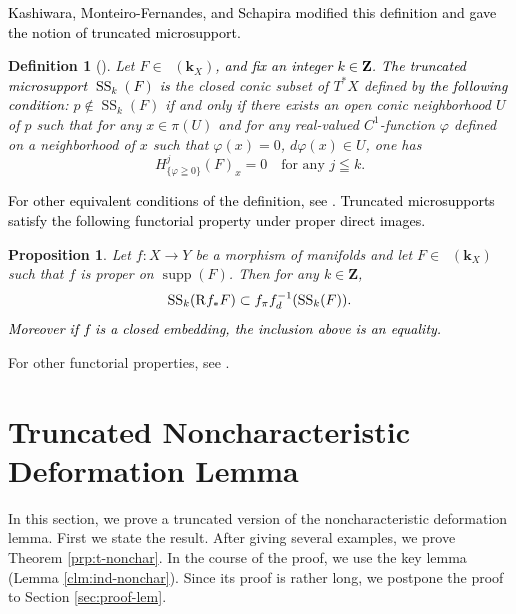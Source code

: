 ﻿\documentclass[a4paper,leqno,dvipdfmx]{jsarticle}
\newtheorem{Definition+}[Axiom+]{Definition}
\newtheorem{Proposition+}[Axiom+]{Proposition}
\theoremstyle{definition}
\newcommand{\zz}{\mathbf{Z}}
\newcommand{\kk}{\mathbf{k}}
\numberwithin{equation}{section}
\newcommand{\supp}{\mathop{\mathrm{supp}}\nolimits}
\newcommand{\Dompb}{\mathop{\mathsf{D}^\mathrm{b}}\nolimits}
\newcommand{\muS}[1][]{\mathop{\mathrm{SS}}\nolimits_{#1}}
\newcommand{\Rder}[1][]{\mathop{\mathrm{R}^{#1}\hspace{-2pt}}\nolimits}
\theoremstyle{mystyle}
\newcommand{\mpb}[1][]{{#1}_{\pi}} %
\newcommand{\mdiff}[1][]{{#1}_{d}} %
\newcommand{\cotb}[1][]{T^{\ast}{#1}}
\begin{document}
\textcolor{black}{Kashiwara, Monteiro-Fernandes, 
and Schapira modified
this definition and gave the notion of truncated microsupport.}

\begin{Definition+}[{\cite[Definition 3.4]{KFS03a}}]
  Let \(F\in\Dompb(\kk_X)\)\textcolor{black}{, and fix an 
  integer \(k\in\zz\)}. 
  \textcolor{black}{The \emph{truncated microsupport} \(\muS[k](F)\) is} 
  the closed conic subset of \(\cotb[X]\) 
  defined by \textcolor{black}{the following condition}: 
  \(p\notin \muS[k](F)\) 
  if and only if 
  there exists an open conic neighborhood \(U\) of \(p\) 
  such that for any \(x\in \pi(U)\) and 
  for any real-valued \(C^{1}\)-function \(\varphi\) 
  defined on a neighborhood of \(x\) such that 
  \(\varphi(x)=0\), \(d\varphi(x)\in U\), 
  one has \begin{equation}
    H^{j}_{\{\varphi\geqq0\}}(F)_x=0
    \quad \text{for any \(j\leqq k\).}
  \end{equation}
\end{Definition+}

\textcolor{black}{For other equivalent conditions of 
the definition, see \cite{KFS03a}. 
Truncated microsupports satisfy 
the following functorial property under proper direct images.}

\begin{Proposition+}
  Let \(f\colon X\to Y\) be a morphism of 
  manifolds and let \(F\in\Dompb(\kk_X)\) such that \(f\) is proper on \(\supp(F)\). 
  Then for any \(k\in\zz\), 
  \begin{equation}\label{eq:t-push}
    \muS[k](\Rder{f_{\ast}}F)\subset
    \mpb[f]\mdiff[f]^{-1}(\muS[k](F)).
  \end{equation}
  \textcolor{black}{Moreover if \(f\) is a closed embedding, 
  the inclusion above is an equality.}
\end{Proposition+}

For other functorial properties, see \cite{KFS03a,FM07}. 

\section{Truncated Noncharacteristic Deformation Lemma}\label{sec:t-nonchar}

In this section, we prove a truncated version of 
the noncharacteristic deformation lemma. 
First we state the result. 
After giving several examples, 
we prove Theorem \ref{prp:t-nonchar}. 
In the course of the proof, 
we use the key lemma (Lemma \ref{clm:ind-nonchar}). 
Since its proof is rather long, 
we postpone the proof to Section \ref{sec:proof-lem}. 
\end{document}

